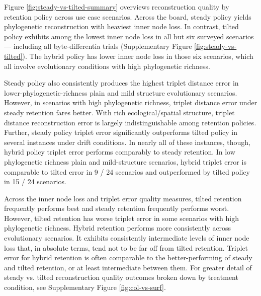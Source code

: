Figure \ref{fig:steady-vs-tilted-summary} overviews reconstruction quality by retention policy across use case scenarios.
Across the board, steady policy yields phylogenetic reconstruction with heaviest inner node loss.
In contrast, tilted policy exhibits among the lowest inner node loss in all but six surveyed scenarios --- including all byte-differentia trials (Supplementary Figure \ref{fig:steady-vs-tilted}).
The hybrid policy has lower inner node loss in those six scenarios, which all involve evolutionary conditions with high phylogenetic richness.

Steady policy also consistently produces the highest triplet distance error in lower-phylogenetic-richness plain and mild structure evolutionary scenarios.
However, in scenarios with high phylogenetic richness, triplet distance error under steady retention fares better.
With rich ecological/spatial structure, triplet distance reconstruction error is largely indistinguishable among retention policies.
Further, steady policy triplet error significantly outperforms tilted policy in several instances under drift conditions.
In nearly all of these instances, though, hybrid policy triplet error performs comparably to steady retention.
In low phylogenetic richness plain and mild-structure scenarios, hybrid triplet error is comparable to tilted error in 9 / 24 scenarios and outperformed by tilted policy in 15 / 24 scenarios.

Across the inner node loss and triplet error quality measures, tilted retention frequently performs best and steady retention frequently performs worst.
However, tilted retention has worse triplet error in some scenarios with high phylogenetic richness.
Hybrid retention performs more consistently across evolutionary scenarios.
It exhibits consistently intermediate levels of inner node loss that, in absolute terms, tend not to be far off from tilted retention.
Triplet error for hybrid retention is often comparable to the better-performing of steady and tilted retention, or at least intermediate between them.
For greater detail of steady vs. tilted reconstruction quality outcomes broken down by treatment condition, see Supplementary Figure \ref{fig:col-vs-surf}.



